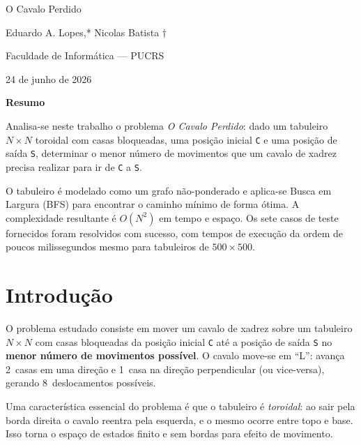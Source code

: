 \documentclass[12pt]{article}
\begin{document}
\begin{titlepage}
\thispagestyle{fancy}
\vspace*{2.2cm}
\begin{center}
{\LARGE O Cavalo Perdido\par}
\vspace{1.2cm}
{\large Eduardo A. Lopes,* Nicolas Batista $\dagger$\par}
\vspace{0.15cm}
{\Large Faculdade de Informática --- PUCRS\par}
\vspace{0.8cm}
{\Large 24 de junho de 2026\par}
\end{center}

\vspace{2.1cm}

\begin{center}
{\large\bfseries Resumo}
\end{center}

Analisa-se neste trabalho o problema \emph{O Cavalo Perdido}: dado um tabuleiro $N \times N$
toroidal com casas bloqueadas, uma posição inicial \texttt{C} e uma posição de saída
\texttt{S}, determinar o menor número de movimentos que um cavalo de xadrez precisa
realizar para ir de \texttt{C} a \texttt{S}.

O tabuleiro é modelado como um grafo não-ponderado e aplica-se Busca em Largura (BFS)
para encontrar o caminho mínimo de forma ótima. A complexidade resultante é $O(N^2)$
em tempo e espaço. Os sete casos de teste fornecidos foram resolvidos com sucesso,
com tempos de execução da ordem de poucos milissegundos mesmo para tabuleiros de
$500 \times 500$.

\end{titlepage}

\setcounter{page}{2}

\section*{Introdução}

O problema estudado consiste em mover um cavalo de xadrez sobre um tabuleiro $N \times N$
com casas bloqueadas da posição inicial \texttt{C} até a posição de saída \texttt{S}
no \textbf{menor número de movimentos possível}. O cavalo move-se em ``L'': avança
2~casas em uma direção e 1~casa na direção perpendicular (ou vice-versa), gerando
8~deslocamentos possíveis.

Uma característica essencial do problema é que o tabuleiro é \emph{toroidal}: ao sair
pela borda direita o cavalo reentra pela esquerda, e o mesmo ocorre entre topo e base.
Isso torna o espaço de estados finito e sem bordas para efeito de movimento.
\end{document}
